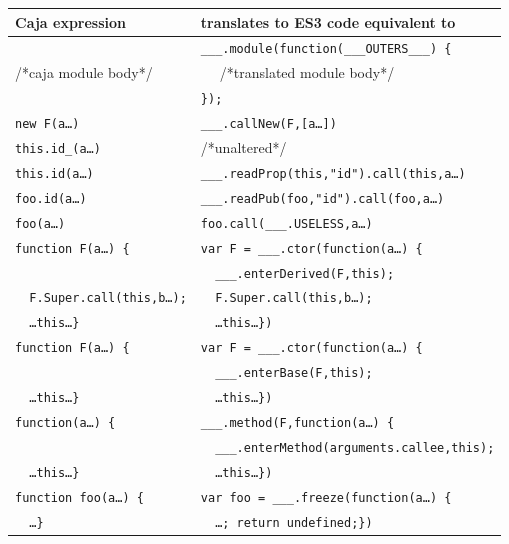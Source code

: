 \documentclass[letterpaper,twocolumn,10pt]{article}
\newcommand{\code}[1]{{\tt {#1}}}              %
\begin{document}
\begin{table}
\begin{tabular}{ll}
  Caja expression   & translates to ES3 code equivalent to\\ 
  \hline
                 & \code{\_\_\_.module(function(\_\_\_OUTERS\_\_\_)\ \{} \\
  /*caja module body*/      
                 & \code{\ \ } /*translated module body*/ \\
                 & \code{\});} \\
  \hline
  \code{new F(a\ldots)}     & \code{\_\_\_.callNew(F,[a\ldots])} \\
  \code{this.id\_(a\ldots)} & /*unaltered*/ \\
  \code{this.id(a\ldots)} 
                 & \code{\_\_\_.readProp(this,"id").call(this,a\ldots)} \\
  \code{foo.id(a\ldots)}  
                 & \code{\_\_\_.readPub(foo,"id").call(foo,a\ldots)} \\
  \code{foo(a\ldots)}       & \code{foo.call(\_\_\_.USELESS,a\ldots)} \\
  \hline
  \code{function F(a\ldots)\ \{}  
                 & \code{var F = \_\_\_.ctor(function(a\ldots)\ \{} \\
                 & \code{\ \ \_\_\_.enterDerived(F,this);} \\
  \code{\ \ F.Super.call(this,b\ldots);}
                 & \code{\ \ F.Super.call(this,b\ldots);} \\
  \code{\ \ \ldots this\ldots\}}
                 & \code{\ \ \ldots this\ldots\})} \\
  \hline
  \code{function F(a\ldots)\ \{}  
                 & \code{var F = \_\_\_.ctor(function(a\ldots)\ \{} \\
                 & \code{\ \ \_\_\_.enterBase(F,this);}\\
  \code{\ \ \ldots this\ldots\}}
                 & \code{\ \ \ldots this\ldots\})}\\
  \hline
  \code{function(a\ldots)\ \{}    
                 & \code{\_\_\_.method(F,function(a\ldots)\ \{} \\
                 & \code{\ \ \_\_\_.enterMethod(arguments.callee,this);}\\
  \code{\ \ \ldots this\ldots\}}
                 & \code{\ \ \ldots this\ldots\})}\\
  
  \hline
  \code{function foo(a\ldots)\ \{}   
                 & \code{var foo = \_\_\_.freeze(function(a\ldots)\ \{} \\
  \code{\ \ \ldots\}}          
                 & \code{\ \ \ldots; return undefined;\})} \\
  

\end{tabular}
\end{table}
\end{document}

